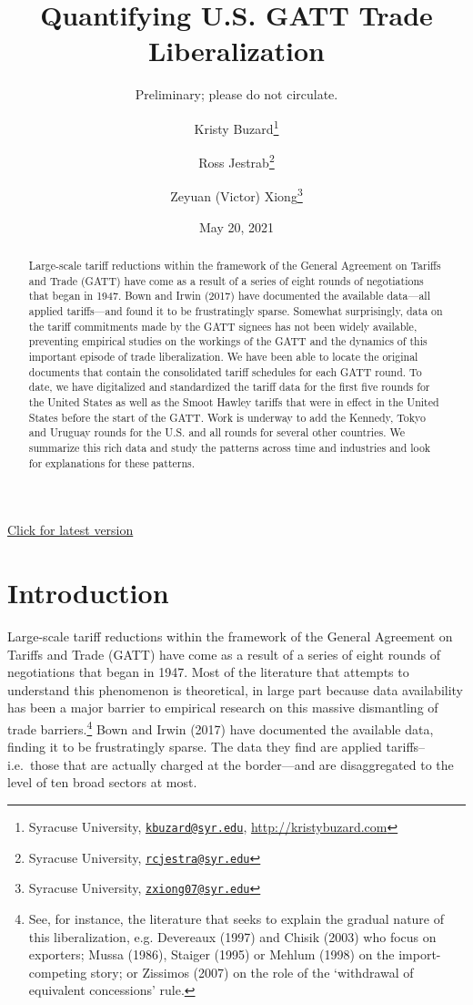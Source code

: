 \documentclass[
  12pt,
]{article}
\title{Quantifying U.S. GATT Trade Liberalization}
\subtitle{Preliminary; please do not circulate.}
\author{Kristy Buzard\footnote{Syracuse University, \href{mailto:kbuzard@syr.edu}{\nolinkurl{kbuzard@syr.edu}}, \url{http://kristybuzard.com}} \and Ross Jestrab\footnote{Syracuse University, \href{mailto:rcjestra@syr.edu}{\nolinkurl{rcjestra@syr.edu}}} \and Zeyuan (Victor) Xiong\footnote{Syracuse University, \href{mailto:zxiong07@syr.edu}{\nolinkurl{zxiong07@syr.edu}}}}
\date{May 20, 2021}
\begin{document}
\maketitle
\begin{abstract}
Large-scale tariff reductions within the framework of the General Agreement on Tariffs and Trade (GATT) have come as a result of a series of eight rounds of negotiations that began in 1947. Bown and Irwin (2017) have documented the available data---all applied tariffs---and found it to be frustratingly sparse. Somewhat surprisingly, data on the tariff commitments made by the GATT signees has not been widely available, preventing empirical studies on the workings of the GATT and the dynamics of this important episode of trade liberalization. We have been able to locate the original documents that contain the consolidated tariff schedules for each GATT round. To date, we have digitalized and standardized the tariff data for the first five rounds for the United States as well as the Smoot Hawley tariffs that were in effect in the United States before the start of the GATT. Work is underway to add the Kennedy, Tokyo and Uruguay rounds for the U.S. and all rounds for several other countries. We summarize this rich data and study the patterns across time and industries and look for explanations for these patterns.
\end{abstract}

\href{https://github.com/kbuzard-SU/gradualism/blob/master/data-paper/data-paper.pdf}{Click for latest version}

\hypertarget{introduction}{%
\section{Introduction}\label{introduction}}

Large-scale tariff reductions within the framework of the General Agreement on Tariffs and Trade (GATT) have come as a result of a series of eight rounds of negotiations that began in 1947. Most of the literature that attempts to understand this phenomenon is theoretical, in large part because data availability has been a major barrier to empirical research on this massive dismantling of trade barriers.\footnote{See, for instance, the literature that seeks to explain the gradual nature of this liberalization, e.g. Devereaux (1997) and  Chisik (2003) who focus on exporters; Mussa (1986), Staiger (1995) or Mehlum (1998) on the import-competing story; or Zissimos (2007) on the role of the `withdrawal of equivalent concessions' rule.} Bown and Irwin (2017) have documented the available data, finding it to be frustratingly sparse. The data they find are applied tariffs--i.e.~those that are actually charged at the border---and are disaggregated to the level of ten broad sectors at most.
\end{document}
